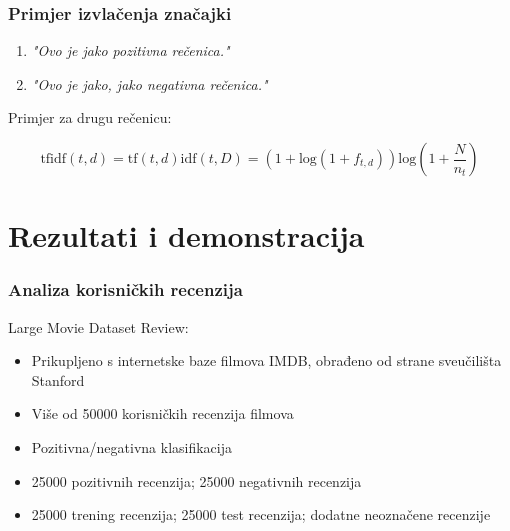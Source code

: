 \documentclass[utf8]{beamer}
\begin{document}
\begin{frame}
\frametitle{Primjer izvlačenja značajki}
\begin{enumerate}
\item \textit{"Ovo je jako pozitivna rečenica."}
\item \textit{"Ovo je jako, jako negativna rečenica."}
\end{enumerate}

Primjer za drugu rečenicu:
\begin{center}
\end{center}

\begin{equation*}
  \text{tfidf}(t, d) = \text{tf}(t, d)\text{idf}(t, D) = 
  (1 + \text{log}(1+ f_{t, d}))\text{log}(1 + \frac{N}{n_t})
\end{equation*}
\end{frame}

\section{Rezultati i demonstracija}

\begin{frame}
\frametitle{Analiza korisničkih recenzija}

Large Movie Dataset Review:
\begin{itemize}
\item Prikupljeno s internetske baze filmova IMDB, obrađeno od strane sveučilišta Stanford
\item Više od 50000 korisničkih recenzija filmova
\item Pozitivna/negativna klasifikacija
\item 25000 pozitivnih recenzija; 25000 negativnih recenzija
\item 25000 trening recenzija; 25000 test recenzija; dodatne neoznačene recenzije
\end{itemize}
\end{frame}
\end{document}
